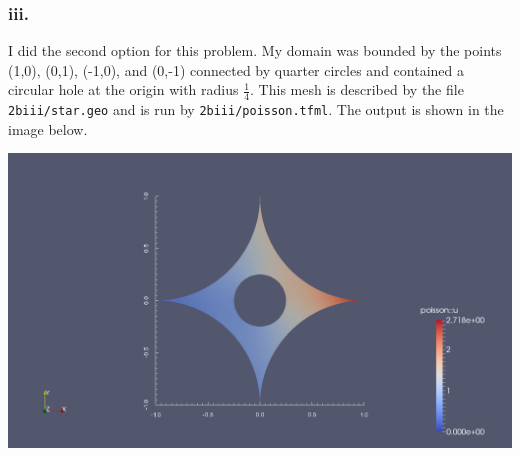 \documentclass{article}
\begin{document}
\subsubsection*{iii.}

I did the second option for this problem. My domain was bounded by the points (1,0), (0,1), (-1,0), and (0,-1) connected by quarter circles and contained a circular hole at the origin with radius $\frac{1}{4}$. This mesh is described by the file \verb|2biii/star.geo| and is run by \verb|2biii/poisson.tfml|. The output is shown in the image below.

\includegraphics[width=\linewidth]{2biii.png}
\end{document}
